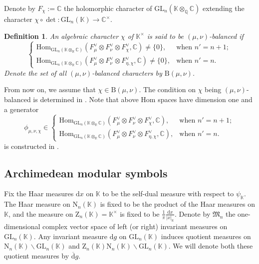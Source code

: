 \documentclass[12pt, a4paper]{amsart}
\newcommand{\BQ}{{\mathbb {Q}}}
\newcommand{\RB}{{\mathrm {B}}}
\newcommand{\RN}{{\mathrm {N}}}
\newcommand{\RZ}{{\mathrm {Z}}}
\newcommand{\GL}{{\mathrm{GL}}}
\newcommand{\C}{\mathbb{C}}
\newcommand{\R}{\mathbb R}
\newcommand{\K}{\mathbb{K}}
\theoremstyle{Theorem}
\theoremstyle{Theorem}
\theoremstyle{Theorem}
\theoremstyle{Theorem}
\theoremstyle{Plain}
\theoremstyle{Definition}
\newtheorem{dfnp}[prp]{Definition}
\begin{document}
	
	Denote by $F_{\chi}:=\C$ the holomorphic character of $\GL_n(\K\otimes_{\BQ}\C)$ extending the character $\chi\circ\det:\GL_{n}(\K)\to\C^{\times}$.
	
	
	
	\begin{dfnp}
		An algebraic character $\chi$ of $\K^{\times}$ is said to be $(\mu,\nu)$-balanced if
		\[
		\begin{cases}
			\mathrm{Hom}_{\GL_{n}(\K\otimes_{\R}\C)}\left(F_{\mu}^{\vee}\otimes F_{\nu}^{\vee}\otimes F_{\chi}^{\vee},\C\right)\neq \{0\},&\text{when }n'=n+1;\\
			\mathrm{Hom}_{\GL_{n}(\K\otimes_{\R}\C)}\left(F_{\mu}^{\vee}\otimes F_{\nu}^{\vee}\otimes F_{\eta,\chi}^{\vee},\C\right)\neq \{0\},&\text{when }n'=n.
		\end{cases}
		\]
		Denote the set of all $(\mu,\nu)$-balanced characters by $\RB(\mu,\nu)$.
	\end{dfnp}
	
	From now on, we assume that $\chi\in\RB(\mu,\nu)$. The condition on $\chi$ being $(\mu,\nu)$-balanced is determined in \cite[Lemma 2.6]{JLSa}. Note that above $\mathrm{Hom}$ spaces have dimension one and a generator
	\[
	\phi_{\mu,\nu,\chi}\in	\begin{cases}
		\mathrm{Hom}_{\GL_{n}(\K\otimes_{\R}\C)}\left(F_{\mu}^{\vee}\otimes F_{\nu}^{\vee}\otimes F_{\chi}^{\vee},\C\right),&\text{when }n'=n+1;\\
		\mathrm{Hom}_{\GL_{n}(\K\otimes_{\R}\C)}\left(F_{\mu}^{\vee}\otimes F_{\nu}^{\vee}\otimes F_{\eta,\chi}^{\vee},\C\right),&\text{when }n'=n.
	\end{cases}
	\]
	is constructed in \cite[Section 1.3]{JLSa}.
	
	
	
	
	\subsection{Archimedean modular symbols}
	
	Fix the Haar measures $\mathrm{d}x$ on $\K$ to be the self-dual measure with respect to $\psi_{\K}$. The Haar measure on $\RN_{n}(\K)$ is fixed to be the product of the Haar measures on $\K$, and the measure on $\RZ_n(\K)=\K^{\times}$ is fixed to be $\frac{1}{\pi}\frac{\mathrm{d}x}{|x|_{\K}}$. Denote by $\mathfrak{M}_{n}$ the one-dimensional complex vector space of left (or right) invariant measures on $\GL_{n}(\K)$. Any invariant measure $\mathrm{d}g$ on $\GL_{n}(\K)$ induces quotient measures on $\RN_{n}(\K)\backslash\GL_{n}(\K)$ and $\RZ_{n}(\K)\RN_{n}(\K)\backslash\GL_{n}(\K)$. We will denote both these quotient measures by $\overline{\mathrm{d}}g$. 
	
\end{document}
